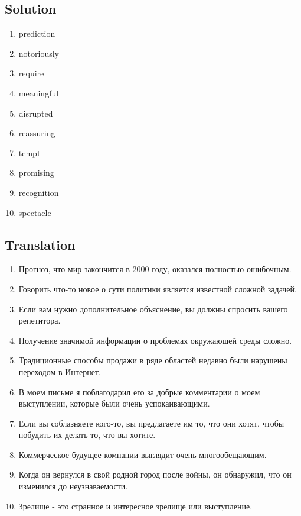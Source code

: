 \subsection*{Solution}
\begin{enumerate}
      \item prediction
      \item notoriously
      \item require
      \item meaningful
      \item disrupted
      \item reassuring
      \item tempt
      \item promising
      \item recognition
      \item spectacle
\end{enumerate}

\subsection*{Translation}
\begin{enumerate}
      \item Прогноз, что мир закончится в 2000 году, оказался полностью ошибочным.
      \item Говорить что-то новое о сути политики является известной сложной задачей.
      \item Если вам нужно дополнительное объяснение, вы должны спросить вашего репетитора.
      \item Получение значимой информации о проблемах окружающей среды сложно.
      \item Традиционные способы продажи в ряде областей недавно были нарушены переходом в Интернет.
      \item В моем письме я поблагодарил его за добрые комментарии о моем выступлении, которые были очень успокаивающими.
      \item Если вы соблазняете кого-то, вы предлагаете им то, что они хотят, чтобы побудить их делать то, что вы хотите.
      \item Коммерческое будущее компании выглядит очень многообещающим.
      \item Когда он вернулся в свой родной город после войны, он обнаружил, что он изменился до неузнаваемости.
      \item Зрелище - это странное и интересное зрелище или выступление.
\end{enumerate}